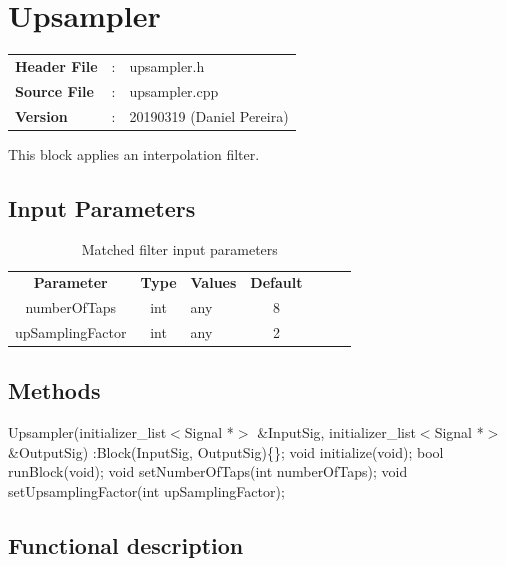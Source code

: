 \clearpage

\section{Upsampler}

\begin{tcolorbox}	
	\begin{tabular}{p{2.75cm} p{0.2cm} p{10.5cm}} 	
		\textbf{Header File}   &:& upsampler.h \\
		\textbf{Source File}   &:& upsampler.cpp \\
        \textbf{Version}       &:& 20190319 (Daniel Pereira)\\
	\end{tabular}
\end{tcolorbox}

This block applies an interpolation filter.

\subsection*{Input Parameters}

\begin{table}[h]
\centering
\begin{tabular}{|c|c|p{60mm}|c|ccc}
\cline{1-4}
\textbf{Parameter} & \textbf{Type}   & \textbf{Values} & \textbf{Default} \\ \cline{1-4}
numberOfTaps       & int             & any             & 8                \\ \cline{1-4}
upSamplingFactor   & int             & any             & 2                \\ \cline{1-4}
\end{tabular}
\caption{Matched filter input parameters} 
\label{table:Upsampler}
\end{table}

\subsection*{Methods}

\bigbreak
Upsampler(initializer\_list$<$Signal *$>$ \&InputSig, initializer\_list$<$Signal *$>$ \&OutputSig) :Block(InputSig, OutputSig)\{\};
\bigbreak
void initialize(void);
\bigbreak
bool runBlock(void);
\bigbreak
void setNumberOfTaps(int numberOfTaps);
\bigbreak
void setUpsamplingFactor(int upSamplingFactor);

\subsection*{Functional description}


